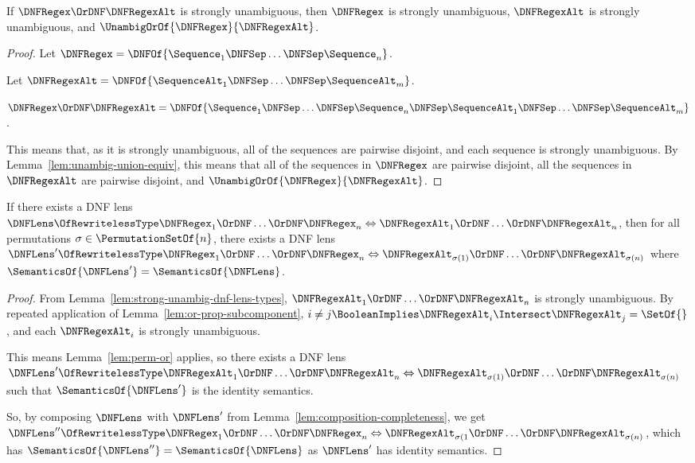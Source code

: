 \documentclass[acmsmall,screen]{acmart}
\begin{document}
\begin{mylemma}
  \label{lem:or-prop-subcomponent}
  If $\DNFRegex \OrDNF \DNFRegexAlt$ is strongly unambiguous, then
  $\DNFRegex$ is strongly unambiguous, $\DNFRegexAlt$ is strongly unambiguous,
  and $\UnambigOrOf{\DNFRegex}{\DNFRegexAlt}$.
\end{mylemma}
\begin{proof}
  Let $\DNFRegex = \DNFOf{\Sequence_1 \DNFSep \ldots \DNFSep \Sequence_n}$.

  Let $\DNFRegexAlt = \DNFOf{\SequenceAlt_1 \DNFSep \ldots \DNFSep
    \SequenceAlt_m}$.

  $\DNFRegex \OrDNF \DNFRegexAlt =
  \DNFOf{\Sequence_1 \DNFSep \ldots \DNFSep \Sequence_n \DNFSep \SequenceAlt_1 \DNFSep \ldots \DNFSep \SequenceAlt_m}$.

  This means that, as it is strongly unambiguous, all of the sequences are
  pairwise disjoint, and each sequence is strongly unambiguous.
  By Lemma~\ref{lem:unambig-union-equiv}, this means that
  all of the sequences in $\DNFRegex$ are pairwise disjoint, all the sequences
  in $\DNFRegexAlt$ are pairwise disjoint, and
  $\UnambigOrOf{\DNFRegex}{\DNFRegexAlt}$.
\end{proof}

\begin{mylemma}
  \label{lem:or-dnf-reordering-right}
  If there exists a DNF lens $\DNFLens \OfRewritelessType \DNFRegex_1 \OrDNF \ldots
  \OrDNF \DNFRegex_n \Leftrightarrow
  \DNFRegexAlt_1 \OrDNF \ldots \OrDNF \DNFRegexAlt_n$, then for all permutations
  $\sigma \in \PermutationSetOf{n}$, there exists a DNF lens $\DNFLens'
  \OfRewritelessType \DNFRegex_1 \OrDNF \ldots \OrDNF \DNFRegex_n
  \Leftrightarrow
  \DNFRegexAlt_{\sigma(1)} \OrDNF \ldots \OrDNF \DNFRegexAlt_{\sigma(n)}$ where
  $\SemanticsOf{\DNFLens'} = \SemanticsOf{\DNFLens}$.
\end{mylemma}
\begin{proof}
  From Lemma~\ref{lem:strong-unambig-dnf-lens-types},
  $\DNFRegexAlt_1 \OrDNF \ldots \OrDNF \DNFRegexAlt_n$ is strongly unambiguous.
  By repeated application of Lemma~\ref{lem:or-prop-subcomponent},
  $i \neq j \BooleanImplies \DNFRegexAlt_i \Intersect \DNFRegexAlt_j =
  \SetOf{}$, and each $\DNFRegexAlt_i$ is strongly unambiguous.

  This means Lemma~\ref{lem:perm-or} applies, so there exists a DNF lens
  $\DNFLens' \OfRewritelessType \DNFRegexAlt_1 \OrDNF \ldots \OrDNF
  \DNFRegexAlt_n \Leftrightarrow
  \DNFRegexAlt_{\sigma(1)} \OrDNF \ldots \OrDNF \DNFRegexAlt_{\sigma(n)}$ such
  that $\SemanticsOf{\DNFLens'}$ is the identity semantics.

  So, by composing $\DNFLens$ with $\DNFLens'$ from
  Lemma~\ref{lem:composition-completeness}, we get\\
  $\DNFLens'' \OfRewritelessType \DNFRegex_1 \OrDNF \ldots \OrDNF \DNFRegex_n
  \Leftrightarrow \DNFRegexAlt_{\sigma(1} \OrDNF \ldots \OrDNF
  \DNFRegexAlt_{\sigma(n)}$, which has $\SemanticsOf{\DNFLens''} =
  \SemanticsOf{\DNFLens}$ as $\DNFLens'$ has identity semantics.
\end{proof}
\end{document}
